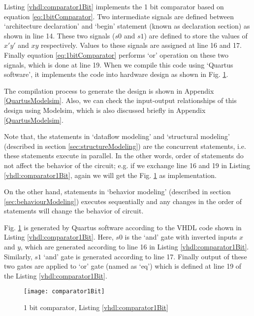 \begin{explanation}
	Listing \ref{vhdl:comparator1Bit} implements the 1 bit comparator based on equation \ref{eq:1bitComparator}. Two intermediate signals are defined between `architecture declaration' and `begin' statement (known as declaration section) as shown in line 14. These two signals ($s0$ and $s1$) are defined to store the values of $x'y'$ and $xy$ respectively. Values to these signals are assigned at line 16 and 17. Finally equation \ref{eq:1bitComparator} performs `or' operation on these two signals, which is done at line 19. When we compile this code using `Quartus software', it implements the code into hardware design as shown in Fig. \ref{fig:comparator1Bit}.
	
	The compilation process to generate the design is shown in Appendix \ref{QuartusModelsim}. Also, we can check the input-output relationships of this design using Modelsim, which is also discussed briefly in Appendix \ref{QuartusModelsim}.   
\end{explanation}


\begin{noNumBox}
Note that, the statements in `dataflow modeling' and `structural modeling' (described in section \ref{sec:structureModeling}) are the concurrent statements, i.e. these statements execute in parallel. In the other words, order of statements do not affect the behavior of the circuit; e.g. if we exchange line 16 and 19 in Listing \ref{vhdl:comparator1Bit}, again we will get the Fig. \ref{fig:comparator1Bit} as implementation. 

On the other hand, statements in `behavior modeling' (described in section \ref{sec:behaviourModeling}) executes sequentially and any changes in the order of statements will change the behavior of circuit. 
\end{noNumBox}

\begin{explanation}
Fig. \ref{fig:comparator1Bit} is generated by Quartus software according to the VHDL code shown in Listing \ref{vhdl:comparator1Bit}. Here, $s0$ is the `and' gate with inverted inputs $x$ and $y$, which are generated according to line 16 in Listing \ref{vhdl:comparator1Bit}. Similarly,  $s1$ `and' gate is generated according to line 17. Finally output of these two gates are applied to `or' gate (named as `eq') which is defined at line 19 of the Listing \ref{vhdl:comparator1Bit}.   
\end{explanation}
\begin{figure}[!h]
	\centering
	\texttt{[image: comparator1Bit]}
	\caption{1 bit comparator, Listing \ref{vhdl:comparator1Bit}}
	\label{fig:comparator1Bit}
\end{figure}

